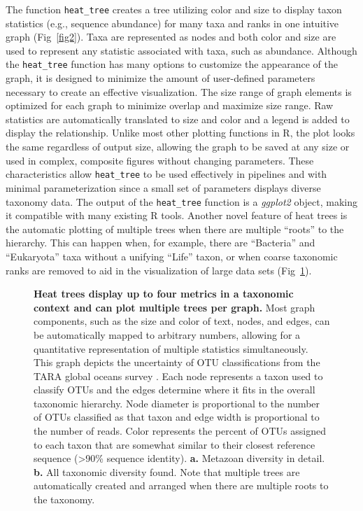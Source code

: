 \documentclass[10pt,letterpaper]{article}
\begin{document}
The function \texttt{heat\_tree} creates a tree utilizing color and size
to display taxon statistics (e.g., sequence abundance) for many taxa and
ranks in one intuitive graph (Fig~\ref{fig2}). Taxa are represented as nodes
and both color and size are used to represent any statistic associated
with taxa, such as abundance. Although the \texttt{heat\_tree} function
has many options to customize the appearance of the graph, it is
designed to minimize the amount of user-defined parameters necessary to
create an effective visualization. The size range of graph elements is
optimized for each graph to minimize overlap and maximize size range.
Raw statistics are automatically translated to size and color and a
legend is added to display the relationship. Unlike most other plotting
functions in R, the plot looks the same regardless of output size,
allowing the graph to be saved at any size or used in complex, composite
figures without changing parameters. These characteristics allow
\texttt{heat\_tree} to be used effectively in pipelines and with minimal
parameterization since a small set of parameters displays diverse
taxonomy data. The output of the \texttt{heat\_tree} function is a
\emph{ggplot2} object, making it compatible with many existing R tools.
Another novel feature of heat trees is the automatic plotting of
multiple trees when there are multiple ``roots'' to the hierarchy. This
can happen when, for example, there are ``Bacteria'' and ``Eukaryota''
taxa without a unifying ``Life'' taxon, or when coarse taxonomic ranks
are removed to aid in the visualization of large data sets (Fig~\ref{fig3}).


\begin{figure}[!h]
\caption{{\bf Heat trees display up to four metrics in a taxonomic
		context and can plot multiple trees per graph.}
Most graph components,
such as the size and color of text, nodes, and edges, can be
automatically mapped to arbitrary numbers, allowing for a quantitative
representation of multiple statistics simultaneously. This graph depicts
the uncertainty of OTU classifications from the TARA global oceans
survey \cite{de2015eukaryotic}. Each node represents a taxon used to
classify OTUs and the edges determine where it fits in the overall
taxonomic hierarchy. Node diameter is proportional to the number of OTUs
classified as that taxon and edge width is proportional to the number of
reads. Color represents the percent of OTUs assigned to each taxon that
are somewhat similar to their closest reference sequence
(\textgreater{}90\% sequence identity). \textbf{a.} Metazoan diversity
in detail. \textbf{b.} All taxonomic diversity found. Note that multiple
trees are automatically created and arranged when there are multiple
roots to the taxonomy.}
\label{fig3}
\end{figure}
\end{document}
